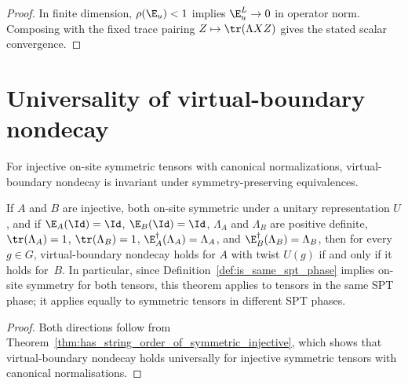\begin{proof}
    \leanok
    In finite dimension, $\rho(\E_u) < 1$ implies $\E_u^L \to 0$ in operator
    norm. Composing with the fixed trace pairing
    $Z \mapsto \tr(\Lambda X Z)$ gives the stated scalar convergence.
\end{proof}

\section{Universality of virtual-boundary nondecay}
\label{sec:app_symmetry_universality}

For injective on-site symmetric tensors with canonical normalizations,
virtual-boundary nondecay is invariant under symmetry-preserving equivalences.

\begin{lemma}%
    \label{thm:has_string_order_iff_of_symmetric_injective}
    \leanok
    If $A$ and $B$ are injective, both on-site symmetric under a
    unitary representation $U$, and if $\E_A(\Id)=\Id$,
    $\E_B(\Id)=\Id$, $\Lambda_A$ and $\Lambda_B$ are positive
    definite, $\tr(\Lambda_A)=1$, $\tr(\Lambda_B)=1$,
    $\E_A^\dagger(\Lambda_A)=\Lambda_A$, and
    $\E_B^\dagger(\Lambda_B)=\Lambda_B$, then for every $g \in G$,
    virtual-boundary nondecay holds for $A$ with twist $U(g)$ if and only if it
    holds for~$B$. In particular, since
    Definition~\ref{def:is_same_spt_phase} implies on-site symmetry
    for both tensors, this theorem applies to tensors in the same SPT
    phase; it applies equally to symmetric tensors in different SPT
    phases.
\end{lemma}

\begin{proof}\leanok
    Both directions follow from
    Theorem~\ref{thm:has_string_order_of_symmetric_injective}, which
    shows that virtual-boundary nondecay holds universally for injective
    symmetric tensors with canonical normalisations.
\end{proof}

